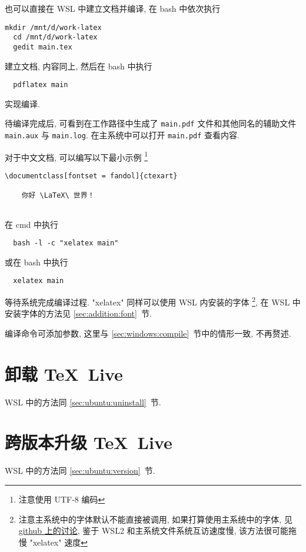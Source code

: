 也可以直接在 WSL 中建立文档并编译,
在 \textsf{bash} 中依次执行
\begin{lstlisting}[deletekeywords = tex]
  mkdir /mnt/d/work-latex
  cd /mnt/d/work-latex
  gedit main.tex
\end{lstlisting}
建立文档,
内容同上,
然后在 \textsf{bash} 中执行
\begin{lstlisting}
  pdflatex main
\end{lstlisting}
实现编译.

待编译完成后, 可看到在工作路径中生成了 \texttt{main.pdf}
文件和其他同名的辅助文件 \texttt{main.aux} 与 \texttt{main.log}.
在主系统中可以打开 \texttt{main.pdf} 查看内容.

对于中文文档,
可以编写以下最小示例%
\footnote{注意使用 UTF-8 编码}%
\begin{lstlisting}[language = mwe]
  \documentclass[fontset = fandol]{ctexart}
  
    你好 \LaTeX\ 世界！
  
\end{lstlisting}
在 \textsf{cmd} 中执行
\begin{lstlisting}
  bash -l -c "xelatex main"
\end{lstlisting}
或在 \textsf{bash} 中执行
\begin{lstlisting}
  xelatex main
\end{lstlisting}
等待系统完成编译过程. 
"xelatex" 同样可以使用 WSL 内安装的字体%
\footnote{注意主系统中的字体默认不能直接被调用,
如果打算使用主系统中的字体,
见
\href{https://github.com/OsbertWang/install-latex-guide-zh-cn/issues/14}{github 上的讨论},
鉴于 WSL2 和主系统文件系统互访速度慢,
该方法很可能拖慢 "xelatex" 速度},
在 WSL 中安装字体的方法见 \ref{sec:addition:font}~节.

编译命令可添加参数, 这里与 \ref{sec:windows:compile}~节中的情形一致, 不再赘述.

\section{卸载 \TeX\ Live}

WSL 中的方法同 \ref{sec:ubuntu:uninstall}~节.

\section{跨版本升级 \TeX\ Live}

WSL 中的方法同 \ref{sec:ubuntu:version}~节.
